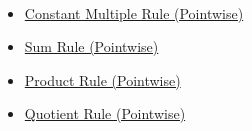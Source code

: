 \begin{remark*}[Dependencies]~\\
\begin{itemize}
  \item \hyperref[thm:constant-multiple-rule]{Constant Multiple Rule (Pointwise)}
  \item \hyperref[thm:sum-rule]{Sum Rule (Pointwise)}
  \item \hyperref[thm:product-rule]{Product Rule (Pointwise)}
  \item \hyperref[thm:quotient-rule]{Quotient Rule (Pointwise)}
\end{itemize}
\end{remark*}